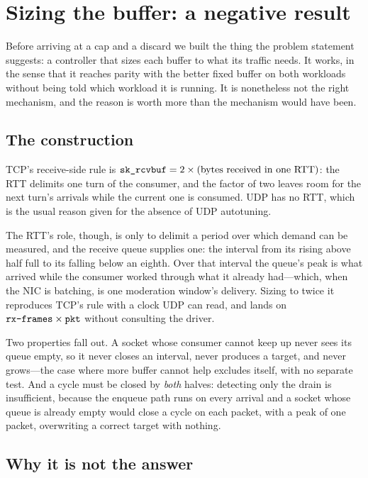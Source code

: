 \section{Sizing the buffer: a negative result}
\label{sec:sizing}

Before arriving at a cap and a discard we built the thing the problem statement
suggests: a controller that sizes each buffer to what its traffic needs. It
works, in the sense that it reaches parity with the better fixed buffer on both
workloads without being told which workload it is running. It is nonetheless not
the right mechanism, and the reason is worth more than the mechanism would have
been.

\subsection{The construction}

TCP's receive-side rule is $\texttt{sk\_rcvbuf} = 2 \times (\text{bytes received in one
RTT})$: the RTT delimits one turn of the consumer, and the factor of two leaves
room for the next turn's arrivals while the current one is consumed. UDP has no
RTT, which is the usual reason given for the absence of UDP autotuning.

The RTT's role, though, is only to delimit a period over which demand can be
measured, and the receive queue supplies one: the interval from its rising above
half full to its falling below an eighth. Over that interval the queue's peak is
what arrived while the consumer worked through what it already had---which, when
the NIC is batching, is one moderation window's delivery. Sizing to twice it
reproduces TCP's rule with a clock UDP can read, and lands on
$\texttt{rx-frames} \times \texttt{pkt}$ without consulting the driver.

Two properties fall out. A socket whose consumer cannot keep up never sees its
queue empty, so it never closes an interval, never produces a target, and never
grows---the case where more buffer cannot help excludes itself, with no separate
test. And a cycle must be closed by \emph{both} halves: detecting only the drain
is insufficient, because the enqueue path runs on every arrival and a socket
whose queue is already empty would close a cycle on each packet, with a peak of
one packet, overwriting a correct target with nothing.

\subsection{Why it is not the answer}


